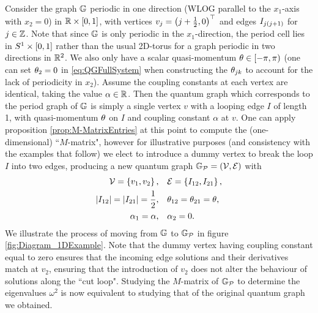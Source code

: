 Consider the graph $\mathbb{G}$ periodic in one direction (WLOG parallel to the $x_1$-axis with $x_2=0$) in $\mathbb{R}\times\left[ 0,1 \right]$, with vertices $v_j = \left( j + \frac{1}{2}, 0 \right)^\top$ and edges $I_{j\left( j+1 \right)}$ for $j\in\mathbb{Z}$.
Note that since $\mathbb{G}$ is only periodic in the $x_1$-direction, the period cell lies in $S^1\times\left[ 0,1 \right]$ rather than the usual 2D-torus for a graph periodic in two directions in $\mathbb{R}^2$.
We also only have a scalar quasi-momentum $\theta\in\left[-\pi,\pi\right)$ (one can set $\theta_2=0$ in \eqref{eq:QGFullSystem} when constructing the $\theta_{jk}$ to account for the lack of periodicity in $x_2$).
Assume the coupling constants at each vertex are identical, taking the value $\alpha\in\mathbb{R}$.
Then the quantum graph which corresponds to the period graph of $\mathbb{G}$ is simply a single vertex $v$ with a looping edge $I$ of length 1, with quasi-momentum $\theta$ on $I$ and coupling constant $\alpha$ at $v$. 
One can apply proposition \ref{prop:M-MatrixEntries} at this point to compute the (one-dimensional) ``$M$-matrix", however for illustrative purposes (and consistency with the examples that follow) we elect to introduce a dummy vertex to break the loop $I$ into two edges, producing a new quantum graph $\mathbb{G}_{\mathcal{P}}=\left( \mathcal{V}, \mathcal{E} \right)$ with
\begin{align*}
	\mathcal{V} = \left\{  v_1 , v_2  \right\}, \quad &\mathcal{E} = \left\{  I_{12}, I_{21}  \right\}, \\
	\left\lvert I_{12} \right\rvert = \left\lvert I_{21} \right\rvert = \frac{1}{2}, \quad &\theta_{12} = \theta_{21} = \theta, \\
	\alpha_1 = \alpha, \quad &\alpha_2 = 0.
\end{align*}
We illustrate the process of moving from $\mathbb{G}$ to $\mathbb{G}_{\mathcal{P}}$ in figure \ref{fig:Diagram_1DExample}.
Note that the dummy vertex having coupling constant equal to zero ensures that the incoming edge solutions and their derivatives match at $v_2$, ensuring that the introduction of $v_2$ does not alter the behaviour of solutions along the ``cut loop".
Studying the $M$-matrix of $\mathbb{G}_{\mathcal{P}}$ to determine the eigenvalues $\omega^2$ is now equivalent to studying that of the original quantum graph we obtained.
